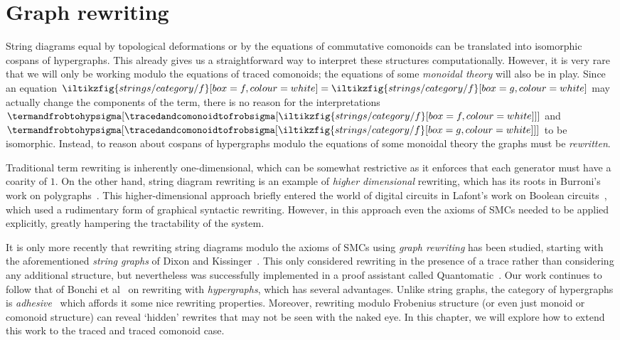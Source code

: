 \chapter{Graph rewriting}\label{chap:rewriting}

String diagrams equal by topological deformations or by the equations of
commutative comonoids can be translated into isomorphic cospans of hypergraphs.
This already gives us a straightforward way to interpret these structures
computationally.
However, it is very rare that we will only be working modulo the equations of
traced comonoids; the equations of some \emph{monoidal theory} will also be in
play.
Since an equation \(
\iltikzfig{strings/category/f}[box=f,colour=white]
=
\iltikzfig{strings/category/f}[box=g,colour=white]
\) may actually change the components of the term, there is no reason for the
interpretations \(
\termandfrobtohypsigma[
    \tracedandcomonoidtofrobsigma[
        \iltikzfig{strings/category/f}[box=f,colour=white]
    ]
]
\) and \(
\termandfrobtohypsigma[
    \tracedandcomonoidtofrobsigma[
        \iltikzfig{strings/category/f}[box=g,colour=white]
    ]
]
\) to be isomorphic.
Instead, to reason about cospans of hypergraphs modulo the equations of some
monoidal theory the graphs must be \emph{rewritten}.

Traditional term rewriting is inherently one-dimensional, which can be somewhat
restrictive as it enforces that each generator must have a coarity of \(1\).
On the other hand, string diagram rewriting is an example of
\emph{higher dimensional} rewriting, which has its roots in Burroni's work on
polygraphs~\cite{burroni1993higherdimensional}.
This higher-dimensional approach briefly entered the world of digital
circuits in Lafont's work on Boolean circuits~\cite{lafont2003algebraic}, which
used a rudimentary form of graphical syntactic rewriting.
However, in this approach even the axioms of SMCs needed to be applied
explicitly, greatly hampering the tractability of the system.

It is only more recently that rewriting string diagrams modulo the axioms of
SMCs using \emph{graph rewriting} has been studied, starting with the
aforementioned \emph{string graphs} of Dixon and
Kissinger~\cite{dixon2010open,kissinger2012pictures,dixon2013opengraphs}.
This only considered rewriting in the presence of a trace rather than
considering any additional structure, but nevertheless was successfully
implemented in a proof assistant called
Quantomatic~\cite{kissinger2015quantomatic}.
Our work continues to follow that of Bonchi et
al~\cite{bonchi2022string,bonchi2022stringa} on rewriting with
\emph{hypergraphs}, which has several advantages.
Unlike string graphs, the category of hypergraphs is
\emph{adhesive}~\cite{lack2004adhesive} which affords it some nice rewriting
properties.
Moreover, rewriting modulo Frobenius structure (or even just monoid or comonoid
structure) can reveal `hidden' rewrites that may not be seen with the naked eye.
In this chapter, we will explore how to extend this work to the traced and
traced comonoid case.

